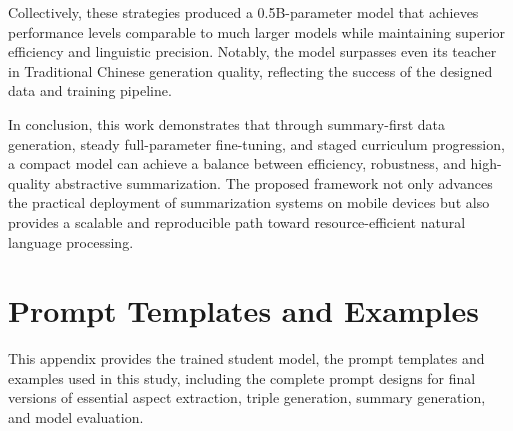 \documentclass[preprint,12pt]{elsarticle}
\begin{document}
Collectively, these strategies produced a 0.5B-parameter model that achieves performance levels comparable to much larger models while maintaining superior efficiency and linguistic precision. Notably, the model surpasses even its teacher in Traditional Chinese generation quality, reflecting the success of the designed data and training pipeline.

In conclusion, this work demonstrates that through summary-first data generation, steady full-parameter fine-tuning, and staged curriculum progression, a compact model can achieve a balance between efficiency, robustness, and high-quality abstractive summarization. The proposed framework not only advances the practical deployment of summarization systems on mobile devices but also provides a scalable and reproducible path toward resource-efficient natural language processing.


\appendix
\section{Prompt Templates and Examples}
\label{app1}

This appendix provides the trained student model, the prompt templates and examples used in this study, including the complete prompt designs for final versions of essential aspect extraction, triple generation, summary generation, and model evaluation.
\newline
\end{document}
